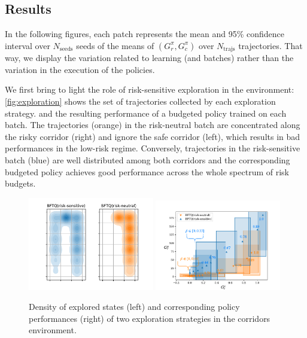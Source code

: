\subsection{Results}
\label{subsec:results}
In the following figures, each patch represents the mean and 95\% confidence interval over $N_{\text{seeds}}$ seeds of the means of $(G_r^\pi,G_c^\pi)$ over $N_\text{trajs}$ trajectories. That way, we display the variation related to learning (and batches) rather than the variation in the execution of the policies.

We first bring to light the role of risk-sensitive exploration in the  environment: \autoref{fig:exploration} shows the set of trajectories collected by each exploration strategy.
and the resulting performance of a budgeted policy trained on each batch. The trajectories (orange) in the risk-neutral batch are concentrated along the risky corridor (right) and ignore the safe corridor (left), which results in bad performances in the low-risk regime. Conversely, trajectories in the risk-sensitive batch (blue) are well distributed among both corridors and the corresponding budgeted policy achieves good performance across the whole spectrum of risk budgets.

\begin{figure}[tp]
	\centering
	\includegraphics[width=0.49\textwidth]{img/corridors_densities.pdf}
	\includegraphics[page=1, width=0.49\textwidth]{img/corridors}
	\caption{Density of explored states (left) and corresponding policy performances (right) of two exploration strategies in the {corridors} environment. }
	\label{fig:exploration}
\end{figure}


